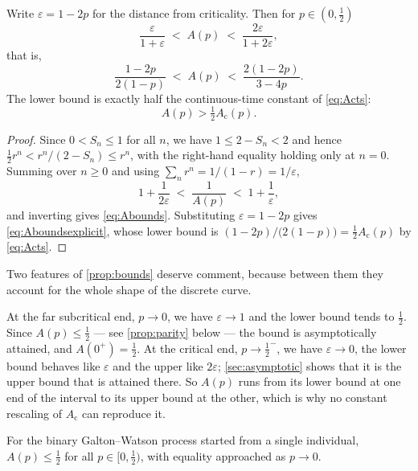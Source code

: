 \begin{proposition}
\label{prop:bounds}
Write $\varepsilon = 1-2p$ for the distance from criticality. Then for
$p\in(0,\tfrac12)$
\begin{equation}
\label{eq:Abounds}
\frac{\varepsilon}{1+\varepsilon} \;<\; A(p) \;<\; \frac{2\varepsilon}{1+2\varepsilon},
\end{equation}
that is,
\begin{equation}
\label{eq:Aboundsexplicit}
\frac{1-2p}{2(1-p)} \;<\; A(p) \;<\; \frac{2(1-2p)}{3-4p}.
\end{equation}
The lower bound is exactly half the continuous-time constant of \cref{eq:Acts}:
\begin{equation}
\label{eq:halfAc}
A(p) > \tfrac12 A_{\text{c}}(p).
\end{equation}
\end{proposition}

\begin{proof}
Since $0<S_n\le1$ for all $n$, we have $1\le 2-S_n<2$ and hence
$\tfrac12 r^n < r^n/(2-S_n) \le r^n$, with the right-hand equality holding only at
$n=0$. Summing over $n\ge0$ and using $\sum_n r^n = 1/(1-r) = 1/\varepsilon$,
\begin{equation*}
1+\frac{1}{2\varepsilon} \;<\; \frac{1}{A(p)} \;<\; 1+\frac{1}{\varepsilon},
\end{equation*}
and inverting gives \cref{eq:Abounds}. Substituting $\varepsilon = 1-2p$ gives
\cref{eq:Aboundsexplicit}, whose lower bound is
$(1-2p)/\bigl(2(1-p)\bigr) = \tfrac12 A_{\text{c}}(p)$ by \cref{eq:Acts}.
\end{proof}

Two features of \cref{prop:bounds} deserve comment, because between them they
account for the whole shape of the discrete curve.

At the far subcritical end, $p\to0$, we have $\varepsilon\to1$ and the lower bound
tends to $\tfrac12$. Since $A(p)\le\tfrac12$ --- see \cref{prop:parity} below --- the
bound is asymptotically attained, and $A(0^+) = \tfrac12$. At the critical end,
$p\to\tfrac12^-$, we have $\varepsilon\to0$, the lower bound behaves like
$\varepsilon$ and the upper like $2\varepsilon$; \cref{sec:asymptotic} shows that it
is the upper bound that is attained there. So $A(p)$ runs from its lower bound at one
end of the interval to its upper bound at the other, which is why no constant
rescaling of $A_{\text{c}}$ can reproduce it.

\begin{proposition}
\label{prop:parity}
For the binary Galton--Watson process started from a single individual,
$A(p)\le\tfrac12$ for all $p\in[0,\tfrac12)$, with equality approached as $p\to0$.
\end{proposition}

